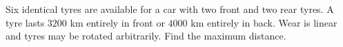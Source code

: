 Six identical tyres are available for a car with two front and two rear tyres. A tyre lasts $3200$ km entirely in front or $4000$ km entirely in back. Wear is linear and tyres may be rotated arbitrarily. Find the maximum distance.

